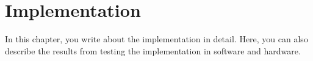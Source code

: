 \chapter{Implementation}
In this chapter, you write about the implementation in detail. Here, you can also describe the results from testing the implementation in software and hardware.
\newpage